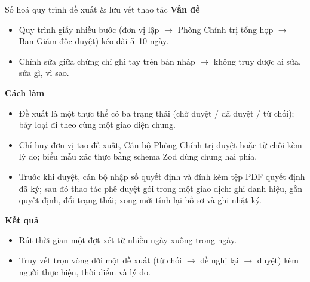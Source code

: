 \documentclass[aspectratio=43,xcolor=table]{beamer}
\begin{document}
\begin{frame}{Số hoá quy trình đề xuất \& lưu vết thao tác}
  \footnotesize
  \textbf{\textcolor{hustred}{Vấn đề}}
  \begin{itemize}\scriptsize
    \item Quy trình giấy nhiều bước (đơn vị lập $\to$ Phòng Chính trị tổng hợp $\to$ Ban Giám đốc duyệt) kéo dài 5--10 ngày.
    \item Chỉnh sửa giữa chừng chỉ ghi tay trên bản nháp $\to$ không truy được ai sửa, sửa gì, vì sao.
  \end{itemize}

  \textbf{\textcolor{hustred}{Cách làm}}
  \begin{itemize}\scriptsize
    \item Đề xuất là một thực thể có ba trạng thái (chờ duyệt / đã duyệt / từ chối); bảy loại đi theo cùng một giao diện chung.
    \item Chỉ huy đơn vị tạo đề xuất, Cán bộ Phòng Chính trị duyệt hoặc từ chối kèm lý do; biểu mẫu xác thực bằng schema Zod dùng chung hai phía.
    \item Trước khi duyệt, cán bộ nhập số quyết định và đính kèm tệp PDF quyết định đã ký; sau đó thao tác phê duyệt gói trong một giao dịch: ghi danh hiệu, gắn quyết định, đổi trạng thái; xong mới tính lại hồ sơ và ghi nhật ký.
  \end{itemize}

  \textbf{\textcolor{hustred}{Kết quả}}
  \begin{itemize}\scriptsize
    \item Rút thời gian một đợt xét từ nhiều ngày xuống trong ngày.
    \item Truy vết trọn vòng đời một đề xuất (từ chối $\to$ đề nghị lại $\to$ duyệt) kèm người thực hiện, thời điểm và lý do.
  \end{itemize}
\end{frame}
\end{document}
